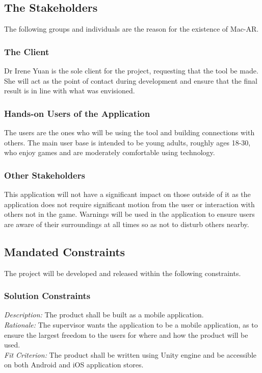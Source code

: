 \documentclass[12pt]{article}
\begin{document}
\subsection{The Stakeholders}
The following groups and individuals are the reason for the existence of Mac-AR. 

\subsubsection{The Client}
Dr Irene Yuan is the sole client for the project, requesting that the tool be made. She will act as the point of contact during development and ensure that the final result is in line with what was envisioned. 

\subsubsection{Hands-on Users of the Application}
The users are the ones who will be using the tool and building connections with others. The main user base is intended to be young adults, roughly ages 18-30, who enjoy games and are moderately comfortable using technology.

\subsubsection{Other Stakeholders}
This application will not have a significant impact on those outside of it as the application does not require significant motion from the user or interaction with others not in the game. Warnings will be used in the application to ensure users are aware of their surroundings at all times so as not to disturb others nearby.

\subsection{Mandated Constraints}
The project will be developed and released within the following constraints. 

\subsubsection{Solution Constraints} \label{SolutionConstraints}
\emph{Description:} The product shall be built as a mobile application.\\
\emph{Rationale:} The supervisor wants the application to be a mobile application, as to ensure the largest freedom to the users for where and how the product will be used.\\
\emph{Fit Criterion:} The product shall be written using Unity engine and be accessible on both Android and iOS application stores.\\
\end{document}

